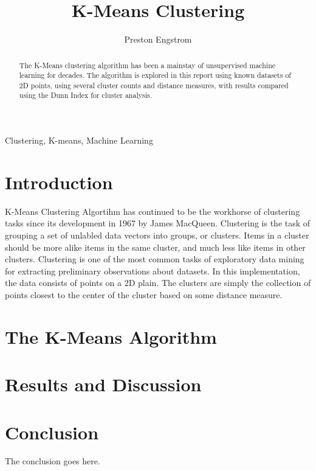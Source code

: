 \documentclass[journal]{IEEEtran}
\begin{document}
\title{K-Means Clustering}

\author{Preston Engstrom}

\maketitle

\begin{abstract}
The K-Means clustering algorithm has been a mainstay of unsupervised machine learning for decades. The algorithm is explored in this report using known datasets of 2D points, using several cluster counts and distance measures, with results compared using the Dunn Index for cluster analysis.
\end{abstract}


\begin{IEEEkeywords}
Clustering, K-means, Machine Learning
\end{IEEEkeywords}

\IEEEpeerreviewmaketitle


\section{Introduction}
 K-Means Clustering Algortihm has continued to be the workhorse of clustering tasks since its development in 1967 by James MacQueen. Clustering is the task of grouping a set of unlabled data vectors into groups, or clusters. Items in a cluster should be more alike items in the same cluster, and much less like items in other clusters. Clustering is one of the most common tasks of exploratory data mining for extracting preliminary observations about datasets. In this implementation, the data consists of points on a 2D plain. The clusters are simply the collection of points closest to the center of the cluster based on some distance measure.

 


\section{The K-Means Algorithm}

\section{Results and Discussion}

\section{Conclusion}
The conclusion goes here.

\ifCLASSOPTIONcaptionsoff
  \newpage
\fi



\end{document}
